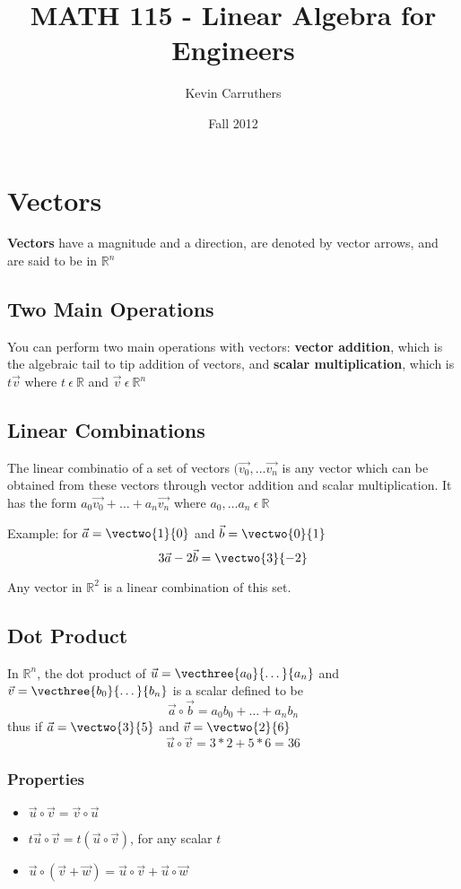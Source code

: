 \documentclass[12pt]{article}
\newcommand{\R}[1]{\mathbb{R}^{#1}}
\begin{document}
\title{MATH 115 - Linear Algebra for Engineers}
\author{Kevin Carruthers}
\date{\vspace{-2ex}Fall 2012}
\maketitle\HRule

\section*{Vectors}
{\bf Vectors} have a magnitude and a direction, are denoted by vector arrows, and are said to be in $\R{n}$

\subsection*{Two Main Operations}
You can perform two main operations with vectors: {\bf vector addition}, which is the algebraic tail to tip addition of vectors, and {\bf scalar multiplication}, which is $t\vec{v}$ where $t\ \epsilon\ \mathbb{R}$ and $\vec{v}\ \epsilon\ \R{n}$

\subsection*{Linear Combinations}
The linear combinatio of a set of vectors $(\vec{v_0},\dots \vec{v_n}$ is any vector which can be obtained from these vectors through vector addition and scalar multiplication. It has the form $a_0\vec{v_0} + \dots + a_n\vec{v_n}$ where $a_0,\dots a_n\ \epsilon\ \mathbb{R}$

Example: for $\vec{a} = \vectwo{1}{0}$ and $\vec{b} = \vectwo{0}{1}$
\[ 3\vec{a} - 2\vec{b} = \vectwo{3}{-2} \]

Any vector in $\R{2}$ is a linear combination of this set.

\subsection*{Dot Product}
In $\R{n}$, the dot product of $\vec{u} = \vecthree{a_0}{\dots}{a_n}$ and $\vec{v} = \vecthree{b_0}{\dots}{b_n}$ is a scalar defined to be \[ \vec{a}\circ\vec{b} = a_0b_0 + \dots + a_nb_n \] thus if $\vec{a} = \vectwo{3}{5}$ and $\vec{v} = \vectwo{2}{6}$ \[ \vec{u}\circ\vec{v} = 3*2 + 5*6 = 36 \]

\subsubsection*{Properties}
\begin{itemize}
\item $\vec{u}\circ\vec{v} = \vec{v}\circ\vec{u}$
\item $t\vec{u}\circ\vec{v} = t(\vec{u}\circ\vec{v})$, for any scalar $t$
\item $\vec{u}\circ(\vec{v} + \vec{w}) = \vec{u}\circ\vec{v} + \vec{u}\circ\vec{w}$
\end{itemize}
\end{document}
